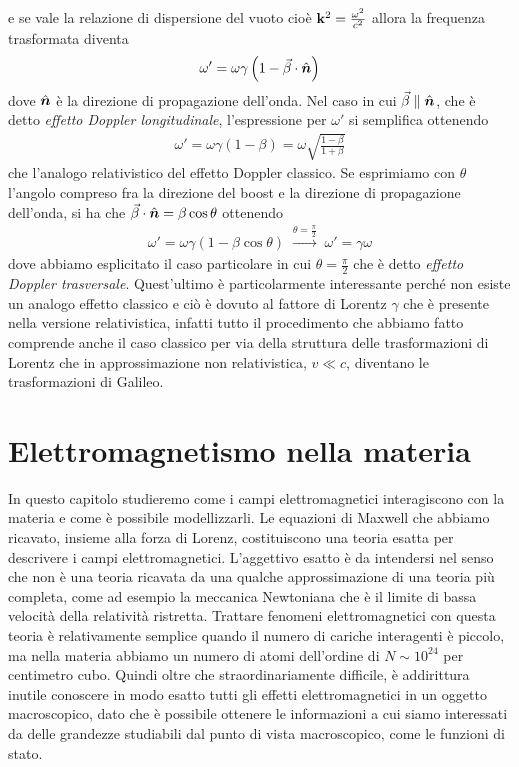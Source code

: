 e se vale la relazione di dispersione del vuoto cioè $ \mathbf{k}^2 = \frac{\omega^2}{c^2} $ allora la frequenza trasformata diventa
\begin{align}
  \omega' = \omega \gamma \left( 1 - \vec{\beta} \cdot \hat{\boldsymbol{n}} \right)
\end{align}
dove $ \hat{\boldsymbol{n}} $ è la direzione di propagazione dell'onda. Nel caso in cui $ \vec{\beta} \parallel  \hat{\boldsymbol{n}} $, 
che è detto \textit{effetto Doppler longitudinale}, l'espressione per $ \omega' $ si semplifica ottenendo
\begin{align}
  \omega' = \omega \gamma \left( 1 - \beta \right) = \omega \sqrt{\frac{1 - \beta}{1 + \beta}}
\end{align}
che l'analogo relativistico del effetto Doppler classico. Se esprimiamo con $ \theta $ l'angolo compreso fra la direzione del boost e la direzione di 
propagazione dell'onda, si ha che $ \vec{\beta} \cdot \hat{\boldsymbol{n}} = \beta \cos\theta $ ottenendo
\begin{align}
  \omega' = \omega \gamma (1 - \beta \cos\theta ) \; \overset{\theta = \frac{\pi}{2}}{\longrightarrow}\; \omega' = \gamma \omega
\end{align}
dove abbiamo esplicitato il caso particolare in cui $ \theta = \frac\pi2 $ che è detto \textit{effetto Doppler trasversale}. Quest'ultimo è particolarmente 
interessante perché non esiste un analogo effetto classico e ciò è dovuto al fattore di Lorentz $ \gamma $ che è presente nella versione relativistica, 
infatti tutto il procedimento che abbiamo fatto comprende anche il caso classico per via della struttura delle trasformazioni di Lorentz che in 
approssimazione non relativistica, $ v \ll c $, diventano le trasformazioni di Galileo.


\chapter{Elettromagnetismo nella materia} \label{chap: elettromagnetismo nella materia}
In questo capitolo studieremo come i campi elettromagnetici interagiscono con la materia e come è possibile modellizzarli. Le equazioni di Maxwell 
che abbiamo ricavato, insieme alla forza di Lorenz, costituiscono una teoria esatta per descrivere i campi elettromagnetici. L'aggettivo esatto è da 
intendersi nel senso che non è una teoria ricavata da una qualche approssimazione di una teoria più completa, come ad esempio la meccanica Newtoniana che 
è il limite di bassa velocità della relatività ristretta. Trattare fenomeni elettromagnetici con questa teoria è relativamente semplice quando il numero di 
cariche interagenti è piccolo, ma nella materia abbiamo un numero di atomi dell'ordine di $ N \sim 10^{24} $ per centimetro cubo. Quindi oltre che 
straordinariamente difficile, è addirittura inutile conoscere in modo esatto tutti gli effetti elettromagnetici in un oggetto macroscopico, dato che è 
possibile ottenere le informazioni a cui siamo interessati da delle grandezze studiabili dal punto di vista macroscopico, come le funzioni di stato.

